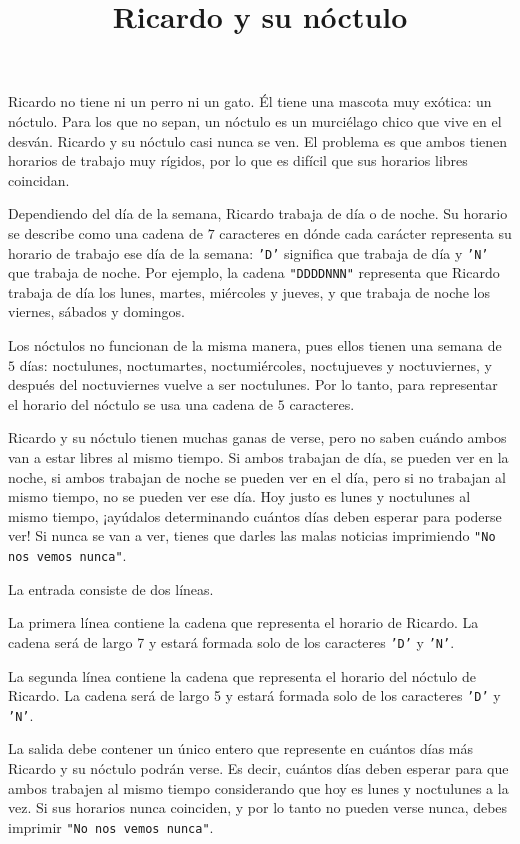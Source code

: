 \documentclass{oci}
\title{Ricardo y su nóctulo}
\begin{document}
\begin{problemDescription}
Ricardo no tiene ni un perro ni un gato.
%
Él tiene una mascota muy exótica: un nóctulo.
%
Para los que no sepan, un nóctulo es un murciélago chico que
vive en el desván.
%
Ricardo y su nóctulo casi nunca se ven.
%
El problema es que ambos tienen horarios de trabajo
muy rígidos, por lo que es difícil que sus
horarios libres coincidan.

Dependiendo del día de la semana, Ricardo trabaja de día o de noche.
%
Su horario se describe como una cadena de $7$ caracteres en dónde cada
carácter representa su horario de trabajo ese día de la semana:
\texttt{'D'} significa que trabaja de día y \texttt{'N'} que trabaja de noche.
%
Por ejemplo, la cadena \texttt{"DDDDNNN"} representa que
Ricardo trabaja de día los lunes, martes, miércoles y jueves,
y que trabaja de noche los viernes, sábados y domingos.

Los nóctulos no funcionan de la misma manera, pues
ellos tienen una semana de $5$ días: noctulunes,
noctumartes, noctumiércoles, noctujueves y noctuviernes,
y después del noctuviernes vuelve a ser noctulunes.
%
Por lo tanto, para representar el horario del nóctulo se usa
una cadena de $5$ caracteres.

Ricardo y su nóctulo tienen muchas ganas de verse, pero no
saben cuándo ambos van a estar libres al mismo tiempo.
%
Si ambos trabajan de día, se pueden ver en la noche, si ambos
trabajan de noche se pueden ver en el día, pero si no trabajan
al mismo tiempo, no se pueden ver ese día.
%
Hoy justo es lunes y noctulunes al mismo tiempo,
%
¡ayúdalos determinando cuántos días deben esperar para poderse ver!
%
Si nunca se van a ver, tienes que darles las malas noticias imprimiendo
\texttt{"No nos vemos nunca"}.
\end{problemDescription}

\begin{inputDescription}
La entrada consiste de dos líneas.

La primera línea contiene la cadena que representa el horario de Ricardo.
%
La cadena será de largo 7 y estará formada solo de los caracteres \texttt{'D'}
y \texttt{'N'}.

La segunda línea contiene la cadena que representa el horario del nóctulo de
Ricardo.
%
La cadena será de largo 5 y estará formada solo de los caracteres \texttt{'D'}
y \texttt{'N'}.
\end{inputDescription}

\begin{outputDescription}
La salida debe contener un único entero que represente en cuántos días más Ricardo y su nóctulo
podrán verse.
%
Es decir, cuántos días deben esperar para que ambos trabajen al mismo tiempo
considerando que hoy es lunes y noctulunes a la vez.
%
Si sus horarios nunca coinciden, y por lo tanto no pueden verse nunca, debes
imprimir \texttt{"No nos vemos nunca"}.
\end{outputDescription}
\end{document}
